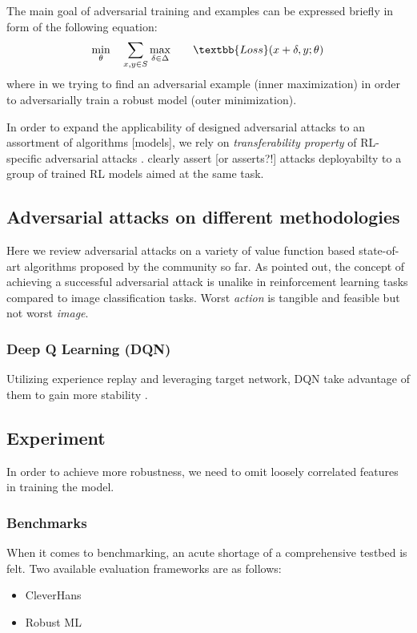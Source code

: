\documentclass[letterpaper,12pt]{article}
\begin{document}
    The main goal of adversarial training and examples can be expressed briefly in form of the following equation:
    \begin{equation*}
        \begin{aligned}
            & \underset{\theta}{\min}
            & & \sum_{x,y \in S} \underset{\delta \in \Delta}{\max}
            & & & \textbb{Loss}(x + \delta, y; \theta)
        \end{aligned}
    \end{equation*}
    where in we trying to find an adversarial example (inner maximization) in order to adversarially train a robust model (outer minimization).


    In order to expand the applicability of designed adversarial attacks to an assortment of algorithms [models], we rely on \textit{transferability property} of RL-specific adversarial attacks \cite{Szegedy2014, Papernot2016, Goodfellow2014a}. \citet{Huang2017} clearly assert [or asserts?!] attacks deployabilty to a group of trained RL models aimed at the same task.

    \subsection{Adversarial attacks on different methodologies}
    Here we review adversarial attacks on a variety of value function based state-of-art algorithms proposed by the community so far. As \citet{Pattanaik2018} pointed out, the concept of achieving a successful adversarial attack is unalike in reinforcement learning tasks compared to image classification tasks. Worst \textit{action} is tangible and feasible but not worst \textit{image}.

    \subsubsection{Deep Q Learning (DQN)}
    Utilizing experience replay and leveraging target network, DQN take advantage of them to gain more stability \cite{Pattanaik2018}.

    \subsection{Experiment}
    In order to achieve more robustness, we need to omit loosely correlated features in training the model.

    \subsubsection{Benchmarks}
    When it comes to benchmarking, an acute shortage of a comprehensive testbed is felt. Two available evaluation frameworks are as follows:
    \begin{itemize}
        \item CleverHans \cite{Papernot2016}
        \item Robust ML
    \end{itemize}
\end{document}
